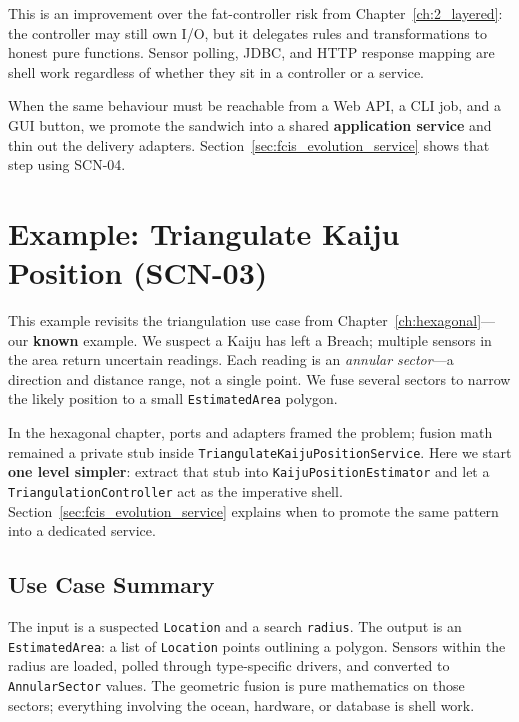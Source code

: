 This is an improvement over the fat-controller risk from Chapter~\ref{ch:2_layered}: the controller may still own I/O, but it delegates rules and transformations to honest pure functions. Sensor polling, JDBC, and HTTP response mapping are shell work regardless of whether they sit in a controller or a service.

When the same behaviour must be reachable from a Web API, a CLI job, and a GUI button, we promote the sandwich into a shared \textbf{application service} and thin out the delivery adapters. Section~\ref{sec:fcis_evolution_service} shows that step using SCN-04.

\section{Example: Triangulate Kaiju Position (SCN-03)}
\label{sec:fcis_example_triangulation}

This example revisits the triangulation use case from Chapter~\ref{ch:hexagonal}---our \textbf{known} example. We suspect a Kaiju has left a Breach; multiple sensors in the area return uncertain readings. Each reading is an \textit{annular sector}---a direction and distance range, not a single point. We fuse several sectors to narrow the likely position to a small \texttt{EstimatedArea} polygon.

In the hexagonal chapter, ports and adapters framed the problem; fusion math remained a private stub inside \texttt{TriangulateKaijuPositionService}. Here we start \textbf{one level simpler}: extract that stub into \texttt{KaijuPositionEstimator} and let a \texttt{TriangulationController} act as the imperative shell. Section~\ref{sec:fcis_evolution_service} explains when to promote the same pattern into a dedicated service.

\subsection{Use Case Summary}
\label{sec:fcis_triangulation_use_case}

The input is a suspected \texttt{Location} and a search \texttt{radius}. The output is an \texttt{EstimatedArea}: a list of \texttt{Location} points outlining a polygon. Sensors within the radius are loaded, polled through type-specific drivers, and converted to \texttt{AnnularSector} values. The geometric fusion is pure mathematics on those sectors; everything involving the ocean, hardware, or database is shell work.


